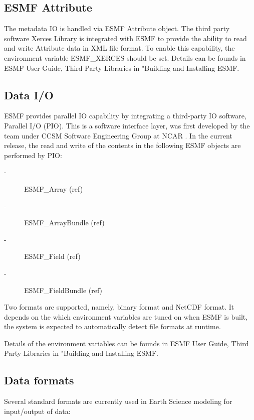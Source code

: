 \subsection{ESMF Attribute}

The metadata IO is handled via ESMF Attribute object. The third
party software Xerces Library is integrated with ESMF to provide
the ability to read and write Attribute data in XML file format.
To enable this capability, the environment variable ESMF\_XERCES should be
set. Details can be founds in ESMF User Guide, Third Party Libraries
in "Building and Installing ESMF.


\subsection{Data I/O}

ESMF provides parallel IO capability by integrating a third-party IO
software, Parallel I/O (PIO). This is a software interface layer, was 
first developed by the team under CCSM Software Engineering Group at NCAR
\cite{CESM_Site}. In the current release, the read and write of the 
contents in the following ESMF objects are performed by PIO:

\begin{description}
\item[-] ESMF\_Array (ref)
\item[-] ESMF\_ArrayBundle (ref)
\item[-] ESMF\_Field (ref)
\item[-] ESMF\_FieldBundle (ref)
\end{description}

Two formats are supported, namely, binary format and NetCDF format.  
It depends on the which environment variables are tuned on when ESMF is built,
the system is expected to automatically detect file formats at runtime.

Details of the environment variables can be founds in ESMF User Guide, 
Third Party Libraries in "Building and Installing ESMF.



\subsection{Data formats}

Several standard formats are currently used in Earth Science modeling
for input/output of data:


